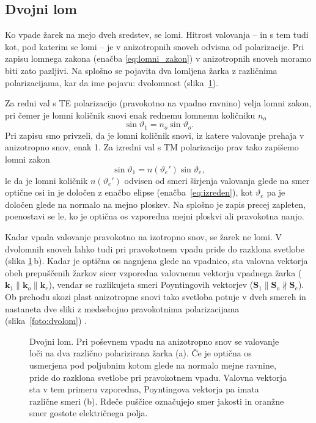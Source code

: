 \subsection*{Dvojni lom}
Ko vpade žarek na mejo dveh sredstev, se lomi. Hitrost valovanja -- in s tem tudi 
kot, pod katerim se lomi -- je v anizotropnih snoveh odvisna od polarizacije.
Pri zapisu lomnega zakona (enačba \ref{eq:lomni_zakon}) 
v anizotropnih snoveh moramo biti zato pazljivi. Na splošno
se pojavita dva lomljena žarka z različnima polarizacijama, kar
da ime pojavu: dvolomnost (slika~\ref{fig:dvolomnost}). 

Za redni val s TE polarizacijo (pravokotno na vpadno ravnino) velja lomni zakon, pri čemer
je lomni količnik snovi enak rednemu lomnemu količniku $n_o$
\begin{equation}
\sin\vartheta_{1}=n_{o}\sin\vartheta_{o}.
\end{equation}
Pri zapisu smo privzeli, da je lomni količnik snovi, iz katere valovanje prehaja v anizotropno snov, 
enak 1. Za izredni val s TM polarizacijo 
prav tako zapišemo lomni zakon
\begin{equation}
\sin\vartheta_{1}=n(\vartheta_e')\sin\vartheta_{e},
\end{equation}
le da je lomni količnik $n(\vartheta_e')$ odvisen od smeri širjenja valovanja glede na smer optične osi
in je določen z enačbo elipse (enačba~\ref{eq:izreden}), kot $\vartheta_e$ pa je določen glede na
normalo na mejno ploskev. Na splošno je zapis precej zapleten, poenostavi se le, 
ko je optična os vzporedna mejni ploskvi ali pravokotna nanjo. 

Kadar vpada valovanje pravokotno na izotropno snov, se žarek ne lomi. V 
dvolomnih snoveh lahko tudi pri pravokotnem vpadu pride do razklona svetlobe (slika
\ref{fig:dvolomnost}\,b). Kadar je optična os nagnjena glede na vpadnico, sta valovna vektorja
obeh prepuščenih žarkov sicer vzporedna valovnemu vektorju vpadnega žarka ($\mathbf{k}_1 \parallel
\mathbf{k}_o \parallel \mathbf{k}_e$), vendar se razlikujeta smeri Poyntingovih vektorjev
($\mathbf{S}_1 \parallel \mathbf{S}_o \nparallel \mathbf{S}_e$). Ob prehodu skozi 
plast anizotropne snovi tako svetloba potuje v dveh smereh in nastaneta dve sliki 
z medsebojno pravokotnima polarizacijama (slika~\ref{foto:dvolom}) . 

\begin{figure}[h]
\centering
\def\svgwidth{140truemm} 

\caption{Dvojni lom. Pri poševnem vpadu na anizotropno snov se
valovanje loči na dva različno polarizirana žarka (a). Če je optična os 
usmerjena pod poljubnim kotom glede na normalo mejne ravnine, pride do razklona svetlobe
pri pravokotnem vpadu. Valovna vektorja sta v tem primeru vzporedna, 
Poyntingova vektorja pa imata različne smeri (b). Rdeče puščice označujejo smer
jakosti in oranžne smer gostote električnega polja.}
\label{fig:dvolomnost}
\end{figure}

